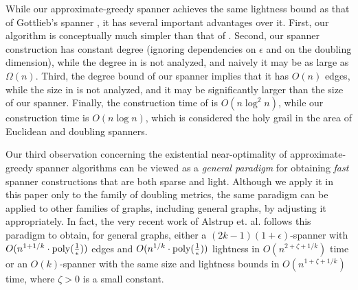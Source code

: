 \documentclass[11pt,letterpaper]{article}
\newcommand{\eps}{\epsilon}
\newcommand{\poly}{{\rm poly}}
\begin{document}
\begin{enumerate}
	\vspace{5pt}	
	While our approximate-greedy spanner achieves the same lightness bound as that of Gottlieb's spanner \cite{Got15}, it has several important advantages over it.
First, our algorithm is conceptually much simpler than that of \cite{Got15}.
	Second, our spanner construction has constant degree (ignoring dependencies on $\eps$ and on the doubling dimension), while the degree in \cite{Got15} is not analyzed, and naively it may be as large as $\Omega(n)$.
	Third, the degree bound of our spanner implies that it has $O(n)$ edges, while the size in \cite{Got15} is not analyzed,
	and it may be significantly larger than the size of our spanner.
Finally, the construction time of \cite{Got15} is $O(n \log^2 n)$, while our construction time is $O(n \log n)$, which is considered the holy grail in the area of Euclidean and doubling spanners.
	
	\vspace{5pt}	
	Our third observation concerning the existential near-optimality of approximate-greedy spanner algorithms
	can be viewed as a \emph{general paradigm} for obtaining \emph{fast} spanner constructions that are both sparse and light.
	Although we apply it in this paper only to the family of doubling metrics, the same paradigm can be applied to other families of graphs, including general graphs, by adjusting it appropriately. In fact, the very recent work of Alstrup et. al. \cite{ADFSW19} follows this paradigm to obtain, for general graphs,
	either a $(2k-1)(1+\eps)$-spanner with $O(n^{1+1/k}\cdot\poly(\frac1\eps))$ edges and $O(n^{1/k}\cdot\poly(\frac1\eps))$ lightness
	in $O(n^{2+\zeta+1/k})$ time
	or an $O(k)$-spanner with the same size and lightness bounds in $O(n^{1+\zeta+1/k})$ time, where $\zeta > 0$ is a small constant.
\end{enumerate}
\end{document}
